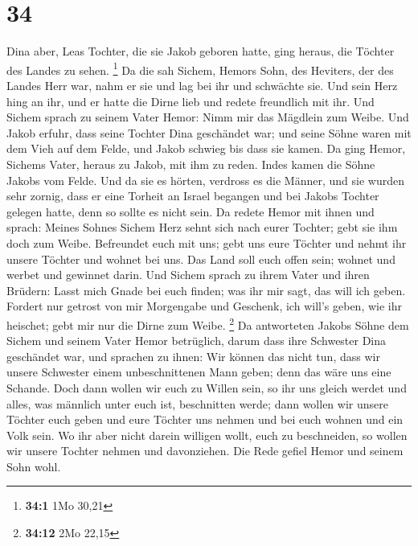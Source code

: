 \hypertarget{section-8}{%
\section{34}\label{section-8}}

 Dina aber, Leas Tochter, die sie Jakob geboren hatte,
ging heraus, die Töchter des Landes zu sehen. \footnote{\textbf{34:1}
  1Mo 30,21}  Da die sah Sichem, Hemors Sohn, des
Heviters, der des Landes Herr war, nahm er sie und lag bei ihr und
schwächte sie.  Und sein Herz hing an ihr, und er hatte
die Dirne lieb und redete freundlich mit ihr.  Und Sichem
sprach zu seinem Vater Hemor: Nimm mir das Mägdlein zum Weibe.
 Und Jakob erfuhr, dass seine Tochter Dina geschändet war;
und seine Söhne waren mit dem Vieh auf dem Felde, und Jakob schwieg bis
dass sie kamen.  Da ging Hemor, Sichems Vater, heraus zu
Jakob, mit ihm zu reden.  Indes kamen die Söhne Jakobs vom
Felde. Und da sie es hörten, verdross es die Männer, und sie wurden sehr
zornig, dass er eine Torheit an Israel begangen und bei Jakobs Tochter
gelegen hatte, denn so sollte es nicht sein.  Da redete
Hemor mit ihnen und sprach: Meines Sohnes Sichem Herz sehnt sich nach
eurer Tochter; gebt sie ihm doch zum Weibe.  Befreundet
euch mit uns; gebt uns eure Töchter und nehmt ihr unsere Töchter
 und wohnet bei uns. Das Land soll euch offen sein;
wohnet und werbet und gewinnet darin.  Und Sichem sprach
zu ihrem Vater und ihren Brüdern: Lasst mich Gnade bei euch finden; was
ihr mir sagt, das will ich geben.  Fordert nur getrost
von mir Morgengabe und Geschenk, ich will's geben, wie ihr heischet;
gebt mir nur die Dirne zum Weibe. \footnote{\textbf{34:12} 2Mo 22,15}
 Da antworteten Jakobs Söhne dem Sichem und seinem Vater
Hemor betrüglich, darum dass ihre Schwester Dina geschändet war,
 und sprachen zu ihnen: Wir können das nicht tun, dass
wir unsere Schwester einem unbeschnittenen Mann geben; denn das wäre uns
eine Schande.  Doch dann wollen wir euch zu Willen sein,
so ihr uns gleich werdet und alles, was männlich unter euch ist,
beschnitten werde;  dann wollen wir unsere Töchter euch
geben und eure Töchter uns nehmen und bei euch wohnen und ein Volk sein.
 Wo ihr aber nicht darein willigen wollt, euch zu
beschneiden, so wollen wir unsere Tochter nehmen und davonziehen.
 Die Rede gefiel Hemor und seinem Sohn wohl.
